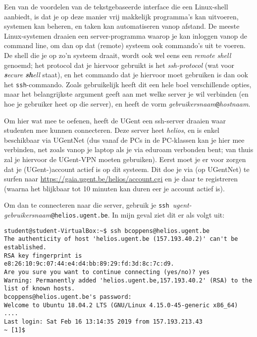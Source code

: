\documentclass[a4paper,twoside,openany]{memoir}
\begin{document}
Een van de voordelen van de tekstgebaseerde interface die een Linux-shell
aanbiedt, is dat je op deze manier vrij makkelijk programma's kan uitvoeren,
systemen kan beheren, en taken kan automatiseren vanop afstand. De meeste
Linux-systemen draaien een server-programma waarop je kan inloggen vanop de
command line, om dan op dat (remote) systeem ook commando's uit te voeren. De
shell die je op zo'n systeem draait, wordt ook wel eens een \emph{remote shell}
genoemd; het protocol dat je hiervoor gebruikt is het \emph{ssh-protocol} (wat
voor \emph{\textbf{s}ecure \textbf{sh}ell} staat), en het commando dat je
hiervoor moet gebruiken is dan ook het \verb!ssh!-commando. Zoals gebruikelijk
heeft dit een hele boel verschillende opties, maar het belangrijkste argument
geeft aan met welke server je wil verbinden (en hoe je gebruiker heet op
die server), en heeft de vorm \emph{gebruikersnaam}\verb!@!\emph{hostnaam}.

Om hier wat mee te oefenen, heeft de UGent een ssh-server draaien waar
studenten mee kunnen connecteren. Deze server heet \emph{helios}, en is enkel
beschikbaar via UGentNet (dus vanaf de PCs in de PC-klassen kan je hier mee
verbinden, net zoals vanop je laptop als je via eduroam verbonden bent; van
thuis zal je hiervoor de UGent-VPN moeten gebruiken). Eerst moet je er voor
zorgen dat je \mbox{(UGent-)account} actief is op dit systeem. Dit doe je via
(op UGentNet) te surfen naar \url{https://gaia.ugent.be/helios/account.cgi} en
je daar te registreren (waarna het blijkbaar tot 10 minuten kan duren eer je
account actief is).

Om dan te connecteren naar die server, gebruik je \verb!ssh !\emph{ugent-gebruikersnaam}\verb!@helios.ugent.be!. In mijn geval ziet dit er als volgt uit:
\begin{verbatim}
student@student-VirtualBox:~$ ssh bcoppens@helios.ugent.be
The authenticity of host 'helios.ugent.be (157.193.40.2)' can't be established.
RSA key fingerprint is e8:26:10:9c:07:44:e4:d4:bb:89:29:fd:3d:8c:7c:d9.
Are you sure you want to continue connecting (yes/no)? yes
Warning: Permanently added 'helios.ugent.be,157.193.40.2' (RSA) to the list of known hosts.
bcoppens@helios.ugent.be's password:
Welcome to Ubuntu 18.04.2 LTS (GNU/Linux 4.15.0-45-generic x86_64)
....
Last login: Sat Feb 16 13:14:35 2019 from 157.193.213.43
~ [1]$
\end{verbatim}
\end{document}
